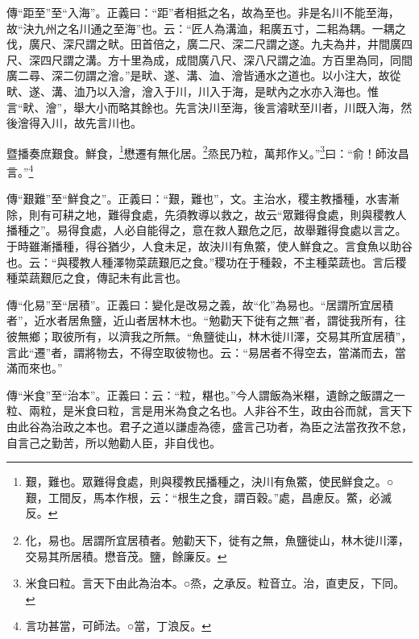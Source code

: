 {\noindent\zhuan{}\fzbyks 傳“距至”至“入海”。正義曰：“距”者相抵之名，故為至也。非是名川不能至海，故“決九州之名川通之至海”也。云：“匠人為溝洫，耜廣五寸，二耜為耦。一耦之伐，廣尺、深尺謂之畎。田首倍之，廣二尺、深二尺謂之遂。九夫為井，井間廣四尺、深四尺謂之溝。方十里為成，成間廣八尺、深八尺謂之洫。方百里為同，同間廣二尋、深二仞謂之澮。”是畎、遂、溝、洫、澮皆通水之道也。以小注大，故從畎、遂、溝、洫乃以入澮，澮入于川，川入于海，是畎內之水亦入海也。惟言“畎、澮”，舉大小而略其餘也。先言決川至海，後言濬畎至川者，川既入海，然後澮得入川，故先言川也。 \par}

暨播奏庶艱食。鮮食，\footnote{艱，難也。眾難得食處，則與稷教民播種之，決川有魚鱉，使民鮮食之。○艱，工間反，馬本作根，云：“根生之食，謂百穀。”處，昌慮反。鱉，必滅反。}懋遷有無化居。\footnote{化，易也。居謂所宜居積者。勉勸天下，徙有之無，魚鹽徙山，林木徙川澤，交易其所居積。懋音茂。鹽，餘廉反。}烝民乃粒，萬邦作乂。”\footnote{米食曰粒。言天下由此為治本。○烝，之承反。粒音立。治，直吏反，下同。}曰：“俞！師汝昌言。”\footnote{言功甚當，可師法。○當，丁浪反。}

{\noindent\zhuan{}\fzbyks 傳“艱難”至“鮮食之”。正義曰：“艱，難也”，文。主治水，稷主教播種，水害漸除，則有可耕之地，難得食處，先須教導以救之，故云“眾難得食處，則與稷教人播種之”。易得食處，人必自能得之，意在救人艱危之厄，故舉難得食處以言之。于時雖漸播種，得谷猶少，人食未足，故決川有魚鱉，使人鮮食之。言食魚以助谷也。云：“與稷教人種澤物菜蔬艱厄之食。”稷功在于種穀，不主種菜蔬也。言后稷種菜蔬艱厄之食，傳記未有此言也。 \par}

{\noindent\zhuan{}\fzbyks 傳“化易”至“居積”。正義曰：變化是改易之義，故“化”為易也。“居謂所宜居積者”，近水者居魚鹽，近山者居林木也。“勉勸天下徙有之無”者，謂徙我所有，往彼無鄉；取彼所有，以濟我之所無。“魚鹽徙山，林木徙川澤，交易其所宜居積”，言此“遷”者，謂將物去，不得空取彼物也。云：“易居者不得空去，當滿而去，當滿而來也。” \par}

{\noindent\zhuan{}\fzbyks 傳“米食”至“治本”。正義曰：云：“粒，糂也。”今人謂飯為米糂，遺餘之飯謂之一粒、兩粒，是米食曰粒，言是用米為食之名也。人非谷不生，政由谷而就，言天下由此谷為治政之本也。君子之道以謙虛為德，盛言己功者，為臣之法當孜孜不怠，自言己之勤苦，所以勉勸人臣，非自伐也。 \par}

